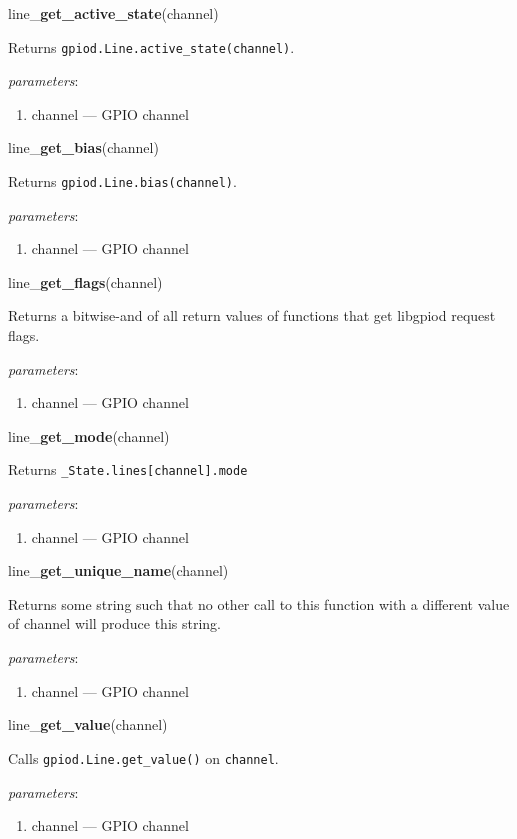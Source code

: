 \documentclass[12pt]{article}
\begin{document}
\noindent line\_\textbf{get\_active\_state}(channel)

Returns \texttt{gpiod.Line.active\_state(channel)}.

\textit{parameters}:
\begin{enumerate}      
        \item channel --- GPIO channel
\end{enumerate}

\noindent line\_\textbf{get\_bias}(channel)

Returns \texttt{gpiod.Line.bias(channel)}.

\textit{parameters}:
\begin{enumerate}      
        \item channel --- GPIO channel
\end{enumerate}

\noindent line\_\textbf{get\_flags}(channel)

Returns a bitwise-and of all return values of functions that get libgpiod request flags.

\textit{parameters}:
\begin{enumerate}      
        \item channel --- GPIO channel
\end{enumerate}

\noindent line\_\textbf{get\_mode}(channel)

Returns \texttt{\_State.lines[channel].mode}

\textit{parameters}:
\begin{enumerate}      
        \item channel --- GPIO channel
\end{enumerate}

\noindent line\_\textbf{get\_unique\_name}(channel)

Returns some string such that no other call to this function with a different value of channel will produce this string.

\textit{parameters}:
\begin{enumerate}      
        \item channel --- GPIO channel
\end{enumerate}

\noindent line\_\textbf{get\_value}(channel)

Calls \texttt{gpiod.Line.get\_value()} on \texttt{channel}.

\textit{parameters}:
\begin{enumerate}      
        \item channel --- GPIO channel
\end{enumerate}
\end{document}
